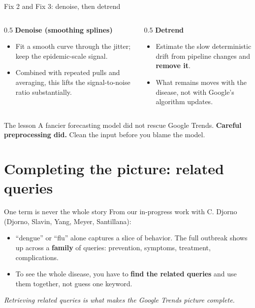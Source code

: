 \documentclass[aspectratio=169,11pt]{beamer}
\begin{document}
\begin{frame}{Fix 2 and Fix 3: denoise, then detrend}
  \begin{columns}[T]
    \begin{column}{0.5\textwidth}
      \textbf{Denoise (smoothing splines)}
      \begin{itemize}
        \item Fit a smooth curve through the jitter; keep the epidemic-scale signal.
        \item Combined with repeated pulls and averaging, this lifts the
              signal-to-noise ratio substantially.
      \end{itemize}
    \end{column}
    \begin{column}{0.5\textwidth}
      \textbf{Detrend}
      \begin{itemize}
        \item Estimate the slow deterministic drift from pipeline changes and
              \textbf{remove it}.
        \item What remains moves with the disease, not with Google's algorithm updates.
      \end{itemize}
    \end{column}
  \end{columns}
  \vfill
  \begin{block}{The lesson}
    A fancier forecasting model did not rescue Google Trends. \textbf{Careful preprocessing
    did.} Clean the input before you blame the model.
  \end{block}
\end{frame}

\section{Completing the picture: related queries}

\begin{frame}{One term is never the whole story}
  From our in-progress work with C. Djorno (Djorno, Slavin, Yang, Meyer, Santillana):
  \begin{itemize}
    \item ``dengue'' or ``flu'' alone captures a slice of behavior. The full outbreak
          shows up across a \textbf{family} of queries: prevention, symptoms, treatment,
          complications.
    \item To see the whole disease, you have to \textbf{find the related queries} and use
          them together, not guess one keyword.
  \end{itemize}
  \vspace{0.3em}
  \begin{center}
    \itshape Retrieving related queries is what makes the Google Trends picture complete.
  \end{center}
\end{frame}
\end{document}
